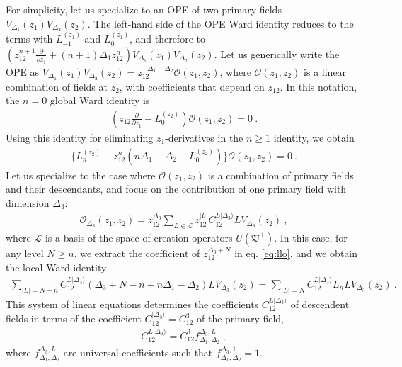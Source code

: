 \documentclass[12pt, a4paper, notitlepage, twoside]{report}
\numberwithin{equation}{section}
\theoremstyle{break}
\begin{document}
For simplicity, let us specialize to an OPE of two primary fields $V_{\Delta_1}(z_1)V_{\Delta_2}(z_2)$. 
The left-hand side of the OPE Ward identity reduces to the terms with $L_{-1}^{(z_1)}$ and $L_0^{(z_1)}$, and therefore to $\left(z_{12}^{n+1}\frac{\partial}{\partial z_1} + (n+1)\Delta_1z_{12}^n\right) V_{\Delta_1}(z_1)V_{\Delta_2}(z_2)$. 
Let us generically write the OPE as $V_{\Delta_1}(z_1)V_{\Delta_2}(z_2) = z_{12}^{-\Delta_1-\Delta_2}\mathcal{O}(z_1,z_2)$, where $\mathcal{O}(z_1,z_2)$ is a linear combination of fields at $z_2$, with coefficients that depend on $z_{12}$. In this notation, the $n=0$ global Ward identity is 
\begin{align}
 \left(z_{12}\frac{\partial}{\partial z_1} - L_0^{(z_2)}\right) \mathcal{O}(z_1,z_2) = 0 \ .
\end{align}
Using this identity for eliminating $z_1$-derivatives in the $n\geq 1$ identity, we obtain
\begin{align}
 \Bigg\{ L_n^{(z_2)} - z_{12}^n \left( n\Delta_1-\Delta_2+L_0^{(z_2)}\right)\Bigg\} \mathcal{O}(z_1,z_2) = 0 \ .
 \label{eq:llo}
\end{align}
Let us specialize to the case where $\mathcal{O}(z_1,z_2)$ is a combination of primary fields and their descendants, and focus on the contribution of one primary field with dimension $\Delta_3$:
\begin{align}
 \mathcal{O}_{\Delta_3}(z_1,z_2) = z_{12}^{\Delta_3}\sum_{L\in\mathcal{L}} z_{12}^{|L|} C^{L|\Delta_3\rangle}_{12} LV_{\Delta_3}(z_2)\ , 
\end{align}
where $\mathcal{L}$ is a basis of the space of creation operators $U(\mathfrak{V}^+)$.
In this case, for any level $N\geq n$, we extract the coefficient of $z_{12}^{\Delta_3+N}$ in eq. \eqref{eq:llo}, and we obtain the local Ward identity
\begin{align}
 \sum_{|L|=N-n} C^{L|\Delta_3\rangle}_{12}(\Delta_3+N-n+n\Delta_1-\Delta_2)L V_{\Delta_3}(z_2)
 = 
 \sum_{|L|=N} C^{L|\Delta_3\rangle}_{12}L_nL V_{\Delta_3}(z_2)\ .
 \label{eq:lwo}
\end{align}
This system of linear equations determines the coefficients $C^{L|\Delta_3\rangle}_{12}$ of descendent fields in terms of the coefficient $C^{|\Delta_3\rangle}_{12}=C^3_{12}$ of the primary field,
\begin{align}
 C^{L|\Delta_3\rangle}_{12} 
 = 
 C^{3}_{12} f^{\Delta_3,L}_{\Delta_1,\Delta_2}\ ,
\end{align}
where  $f^{\Delta_3,L}_{\Delta_1,\Delta_2}$ are universal coefficients such that $f^{\Delta_3,1}_{\Delta_1,\Delta_2} =1$.
\end{document}
